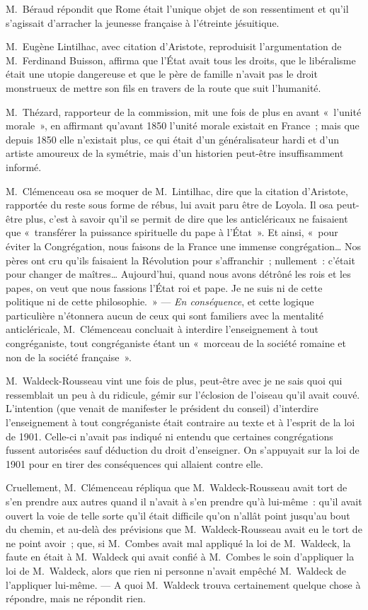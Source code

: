 \documentclass[french,twoside]{book} %
\begin{document}
M. Béraud répondit que Rome était l’unique objet de son ressentiment et qu’il s’agissait d’arracher la jeunesse française à l’étreinte jésuitique.\par
M. Eugène Lintilhac, avec citation d’Aristote, reproduisit l’argumentation de M. Ferdinand  Buisson, affirma que l’État avait tous les droits, que le libéralisme était une utopie dangereuse et que le père de famille n’avait pas le droit monstrueux de mettre son fils en travers de la route que suit l’humanité.\par
M. Thézard, rapporteur de la commission, mit une fois de plus en avant « l’unité morale », en affirmant qu’avant 1850 l’unité morale existait en France ; mais que depuis 1850 elle n’existait plus, ce qui était d’un généralisateur hardi et d’un artiste amoureux de la symétrie, mais d’un historien peut-être insuffisamment informé.\par
M. Clémenceau osa se moquer de M. Lintilhac, dire que la citation d’Aristote, rapportée du reste sous forme de rébus, lui avait paru être de Loyola. Il osa peut-être plus, c’est à savoir qu’il se permit de dire que les anticléricaux ne faisaient que « transférer la puissance spirituelle du pape à l’État ». Et ainsi, « pour éviter la Congrégation, nous faisons de la France une immense congrégation… Nos pères ont cru qu’ils faisaient la Révolution pour s’affranchir ; nullement : c’était pour changer de maîtres… Aujourd’hui, quand nous avons détrôné les rois et les papes, on veut que nous fassions l’État roi et pape. Je ne suis ni de cette politique ni de cette philosophie. » — {\itshape En conséquence}, et cette logique particulière n’étonnera aucun de  ceux qui sont familiers avec la mentalité anticléricale, M. Clémenceau concluait à interdire l’enseignement à tout congréganiste, tout congréganiste étant un « morceau de la société romaine et non de la société française ».\par
M. Waldeck-Rousseau vint une fois de plus, peut-être avec je ne sais quoi qui ressemblait un peu à du ridicule, gémir sur l’éclosion de l’oiseau qu’il avait couvé. L’intention (que venait de manifester le président du conseil) d’interdire l’enseignement à tout congréganiste était contraire au texte et à l’esprit de la loi de 1901. Celle-ci n’avait pas indiqué ni entendu que certaines congrégations fussent autorisées sauf déduction du droit d’enseigner. On s’appuyait sur la loi de 1901 pour en tirer des conséquences qui allaient contre elle.\par
Cruellement, M. Clémenceau répliqua que M. Waldeck-Rousseau avait tort de s’en prendre aux autres quand il n’avait à s’en prendre qu’à lui-même : qu’il avait ouvert la voie de telle sorte qu’il était difficile qu’on n’allât point jusqu’au bout du chemin, et au-delà des prévisions que M. Waldeck-Rousseau avait eu le tort de ne point avoir ; que, si M. Combes avait mal appliqué la loi de M. Waldeck, la faute en était à M. Waldeck qui avait confié à M. Combes le soin d’appliquer la loi de M. Waldeck, alors que rien ni personne n’avait empêché  M. Waldeck de l’appliquer lui-même. — A quoi M. Waldeck trouva certainement quelque chose à répondre, mais ne répondit rien.\par
\end{document}
